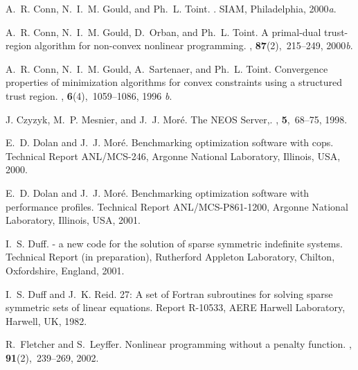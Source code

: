 \documentclass[twoside]{article}
\begin{document}
\begin{thebibliography}{xx}
A.~R. Conn, N.~I.~M. Gould, and Ph.~L. Toint.
.
\newblock SIAM, Philadelphia, 2000{\em a}.

A.~R. Conn, N.~I.~M. Gould, D.~Orban, and Ph.~L. Toint.
\newblock A primal-dual trust-region algorithm for non-convex nonlinear
  programming.
, {\bf 87}(2),~215--249, 2000{\em b}.

A.~R. Conn, N.~I.~M. Gould, A.~Sartenaer, and Ph.~L. Toint.
\newblock Convergence properties of minimization algorithms for convex
  constraints using a structured trust region.
, {\bf 6}(4),~1059--1086, 1996{\em
  b}.

J. Czyzyk, M.~P. Mesnier, and J.~J. Mor\'{e}.
\newblock The {NEOS} {S}erver,.
, {\bf
  5},~68--75, 1998.

E.~D. Dolan and J.~J. Mor\'{e}.
\newblock Benchmarking optimization software with cops.
\newblock Technical Report ANL/MCS-246, Argonne National Laboratory, Illinois,
  USA, 2000.

E.~D. Dolan and J.~J. Mor\'{e}.
\newblock Benchmarking optimization software with performance profiles.
\newblock Technical Report ANL/MCS-P861-1200, Argonne National Laboratory,
  Illinois, USA, 2001.

I.~S. Duff.
 - a new code for the solution of sparse symmetric indefinite
  systems.
\newblock Technical Report (in preparation), Rutherford Appleton Laboratory,
  Chilton, Oxfordshire, England, 2001.

I.~S. Duff and J.~K. Reid.
27: A set of {F}ortran subroutines for solving sparse symmetric
  sets of linear equations.
\newblock Report R-10533, {AERE} {H}arwell Laboratory, Harwell, UK, 1982.

R.~Fletcher and S.~Leyffer.
\newblock Nonlinear programming without a penalty function.
, {\bf 91}(2),~239--269, 2002.


\end{thebibliography}
\end{document}
